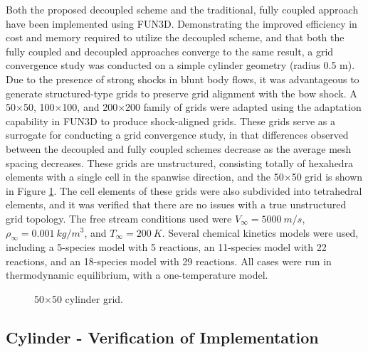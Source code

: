 Both the proposed decoupled scheme and the traditional, fully coupled approach
have been implemented using FUN3D\cite{FUN3D}.  Demonstrating the improved
efficiency in cost and memory required to utilize the decoupled scheme, and that
both the fully coupled and decoupled approaches converge to the same result, a
grid convergence study was conducted on a simple cylinder geometry (radius 0.5
m).  Due to the presence of strong shocks in blunt body flows, it was
advantageous to generate structured-type grids to preserve grid alignment with
the bow shock. A 50$\times$50, 100$\times$100, and 200$\times$200 family
of grids were adapted using the adaptation capability in FUN3D\cite{adaptation}
to produce shock-aligned grids. These grids serve as a surrogate for conducting
a grid convergence study, in that differences observed between the decoupled and
fully coupled schemes decrease as the average mesh spacing decreases.  These
grids are unstructured, consisting totally of hexahedra elements with a single
cell in the spanwise direction, and the 50$\times$50 grid is shown in Figure
\ref{grid}.  The cell elements of these grids were also subdivided into
tetrahedral elements, and it was verified that there are no issues with a true
unstructured grid topology.  The free stream conditions used were $V_{\infty} =
5000\ m/s$, $\rho_{\infty}=0.001\ kg/m^3$, and $T_\infty = 200\ K$.  Several
chemical kinetics models were used, including a 5-species model with 5
reactions, an 11-species model with 22 reactions, and an 18-species model with
29 reactions.  All cases were run in thermodynamic equilibrium, with a
one-temperature model.

\begin{figure}[h]
	\centering
	\caption{50$\times$50 cylinder grid.}
  \label{grid}
\end{figure}

\subsection{Cylinder - Verification of Implementation}

